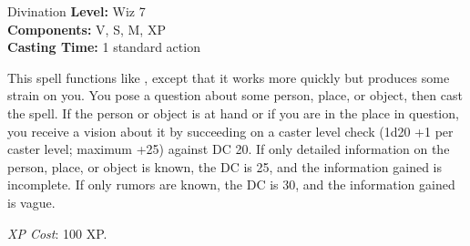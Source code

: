 {Divination}
{
	\textbf{Level:}
	Wiz 7\\
	\textbf{Components:}
	V, S, M, XP\\
	\textbf{Casting Time:}
	1 standard action\\
}
{
	This spell functions like , except that it works more quickly but produces some strain on you. You pose a question about some person, place, or object, then cast the spell. If the person or object is at hand or if you are in the place in question, you receive a vision about it by succeeding on a caster level check (1d20 +1 per caster level; maximum +25) against DC 20. If only detailed information on the person, place, or object is known, the DC is 25, and the information gained is incomplete. If only rumors are known, the DC is 30, and the information gained is vague.

	\textit{XP Cost}:
	100 XP.

}
